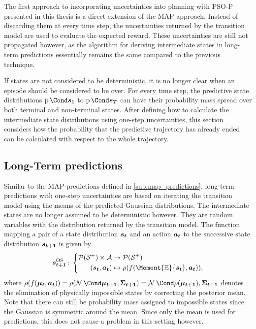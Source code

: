 The first approach to incorporating uncertainties into planning with PSO-P presented in this thesis is a direct extension of the MAP approach.
Instead of discarding them at every time step, the uncertainties returned by the transition model are used to evaluate the expected reward.
These uncertainties are still not propagated however, as the algorithm for deriving intermediate states in long-term predictions essentially remains the same compared to the previous technique.

If states are not considered to be deterministic, it is no longer clear when an episode should be considered to be over.
For every time step, the predictive state distributions $\Prob{\mat{s_1}}$ to $\Prob{\mat{s_T}}$ can have their probability mass spread over both terminal and non-terminal states.
After defining how to calculate the intermediate state distributions using one-step uncertainties, this section considers how the probability that the predictive trajectory has already ended can be calculated with respect to the whole trajectory.

\subsection{Long-Term predictions}
\label{sub:os_predictions}
Similar to the MAP-predictions defined in \cref{sub:map_predictions}, long-term predictions with one-step uncertainties are based on iterating the transition model using the means of the predicted Gaussian distributions.
The intermediate states are no longer assumed to be deterministic however.
They are random variables with the distribution returned by the transition model.
The function mapping a pair of a state distribution $\bm{s_t}$ and an action $\bm{a_t}$ to the successive state distribution $\bm{s_{t+1}}$ is given by
\begin{align}
    \label{eq:os_dynamic_programming}
    \os{\mat{s_{t+1}}} \colon \left\{
        \begin{aligned}
            \Dists(\Es^+) \times \Ah &\to \Dists(\Es^+) \\
            (\rv{s_t}, \mat{a_t}) &\mapsto \squeeze(f(\Moment{\E}{\rv{s_t}}, \mat{a_t})),
    \end{aligned}
    \right.
\end{align}
where $\squeeze(f(\mat{\mu_t}, \mat{a_t})) = \squeeze(\Gaussian{\mat{\mu_{t+1}}, \mat{\Sigma_{t+1}}}) = \Gaussian{\squeeze(\mat{\mu_{t+1}}), \mat{\Sigma_{t+1}}}$ denotes the elimination of physically impossible states by correcting the posterior mean.
Note that there can still be probability mass assigned to impossible states since the Gaussian is symmetric around the mean.
Since only the mean is used for predictions, this does not cause a problem in this setting however.

